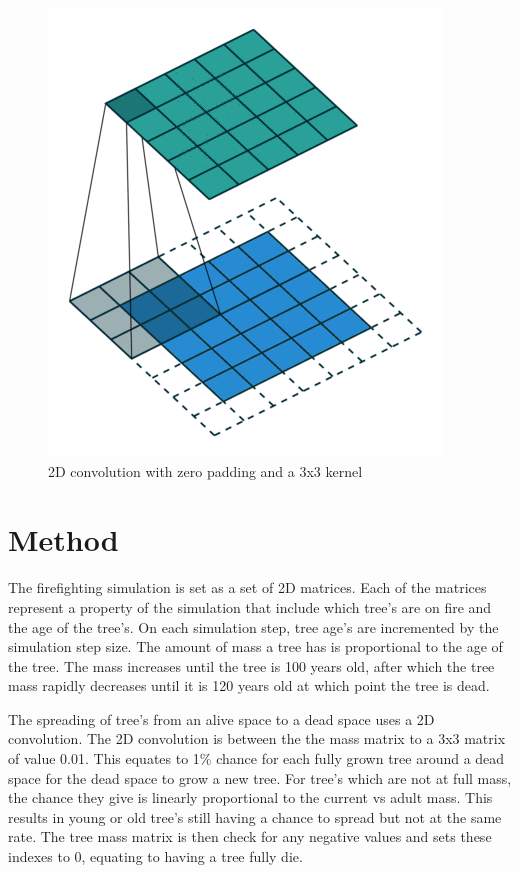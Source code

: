 \documentclass[ aps, pra, reprint, notitlepage ]{revtex4-1}
\begin{document}
\begin{figure}[ht]
	\includegraphics[scale=0.5]{Pictures/StaticConvolution}
	\caption{\label{2DConvolutionFig}2D convolution with zero padding and a 3x3 kernel}
\end{figure}

\section{\label{Method}Method}

The firefighting simulation is set as a set of 2D matrices. Each of the matrices represent a property of the simulation that include which tree's are on fire and the age of the tree's. On each simulation step, tree age's are incremented by the simulation step size. The amount of mass a tree has is proportional to the age of the tree. The mass increases until the tree is 100 years old, after which the tree mass rapidly decreases until it is 120 years old at which point the tree is dead.

The spreading of tree's from an alive space to a dead space uses a 2D convolution. The 2D convolution is between the the mass matrix to a 3x3 matrix of value 0.01. This equates to 1\% chance for each fully grown tree around a dead space for the dead space to grow a new tree. For tree's which are not at full mass, the chance they give is linearly proportional to the current vs adult mass. This results in young or old tree's still having a chance to spread but not at the same rate. The tree mass matrix is then check for any negative values and sets these indexes to 0, equating to having a tree fully die.
\end{document}
